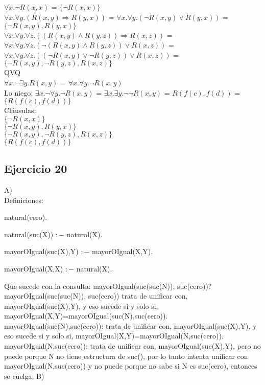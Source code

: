 \documentclass[10pt,a4paper]{article}
\begin{document}
  \subsection{}
$\forall x. \neg R(x,x)$ = $\{\neg R(x,x)\}$ \\
$\forall x. \forall y. (R(x,y) \Rightarrow R(y,x))$ = $\forall x. \forall y. (\neg R(x,y) \vee R(y,x))$ = $\{\neg R(x,y), R(y,x)\}$ \\
$\forall x. \forall y. \forall z. ((R(x,y) \wedge R(y,z)) \Rightarrow R(x,z))$ = $\forall x. \forall y. \forall z. ( \neg (R(x,y) \wedge R(y,z)) \vee R(x,z))$ = $\forall x. \forall y. \forall z. ( (\neg R(x,y) \vee \neg R(y,z)) \vee R(x,z))$ = $\{\neg R(x,y), \neg R(y,z), R(x,z)\}$ \\
QVQ\\
$\forall x. \neg \exists y. R(x,y)$ = $\forall x. \forall y. \neg R(x,y)$ \\
Lo niego: $\exists x. \neg \forall y. \neg R(x,y)$ = $\exists x. \exists y. \neg \neg R(x,y)$ = $R(f(c),f(d))$ = $\{R(f(c),f(d))\}$ \\
Cláusulas: \\
$\{\neg R(x,x)\}$ \\
$\{\neg R(x,y), R(y,x)\}$ \\
$\{\neg R(x,y), \neg R(y,z), R(x,z)\}$ \\
$\{R(f(c),f(d))\}$
  \subsection{Ejercicio 20}
	A) \\
	Definiciones:
	\begin{itemieze}
	\item natural(cero).
	\item natural(suc(X)) $:-$ natural(X).
	\item mayorOIgual(suc(X),Y) $:-$ mayorOIgual(X,Y).
	\item mayorOIgual(X,X) $:-$ natural(X).
	\end{itemieze}

	Que sucede con la consulta: mayorOIgual(suc(suc(N)), suc(cero))?
	mayorOIgual(suc(suc(N)), suc(cero)) trata de unificar con, mayorOIgual(suc(X),Y), y eso sucede si y solo si, mayorOIgual(X,Y)=mayorOIgual(suc(N),suc(cero)).
	mayorOIgual(suc(N),suc(cero)): trata de unificar con, mayorOIgual(suc(X),Y), y eso sucede si y solo si, mayorOIgual(X,Y)=mayorOIgual(N,suc(cero)).
	mayorOIgual(N,suc(cero)): trata de unificar con, mayorOIgual(suc(X),Y), pero no puede porque N no tiene estructura de suc(), por lo tanto intenta unificar con mayorOIgual(N,suc(cero)) y no puede porque no sabe si N es suc(cero), entonces se cuelga. 
	B) \\
\end{document}
